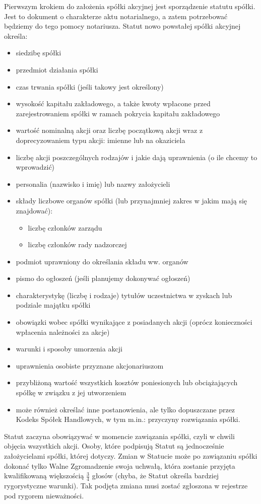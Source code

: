 \documentclass[11pt]{article}
\begin{document}
	
Pierwszym krokiem do założenia spółki akcyjnej jest sporządzenie statutu spółki.
	Jest to dokument o charakterze aktu notarialnego, a zatem potrzebować będziemy do tego pomocy notariusza. 
Statut nowo powstałej spółki akcyjnej określa:
\begin{itemize}
\item siedzibę spółki
\item przedmiot działania spółki
\item czas trwania spółki (jeśli takowy jest określony)
\item wysokość kapitału zakładowego, a także kwoty wpłacone przed zarejestrowaniem spółki w ramach pokrycia kapitału zakładowego
\item wartość nominalną akcji oraz liczbę początkową akcji wraz z doprecyzowaniem typu akcji: imienne lub na okaziciela
\item liczbę akcji poszczególnych rodzajów i jakie dają uprawnienia (o ile chcemy to wprowadzić)
\item personalia (nazwisko i imię) lub nazwy założycieli
\item składy liczbowe organów spółki (lub przynajmniej zakres w jakim mają się znajdować):
\begin{itemize}
\item liczbę członków zarządu
\item liczbę członków rady nadzorczej
\end{itemize}
\item podmiot uprawniony do określania składu ww. organów
\item pismo do ogłoszeń (jeśli planujemy dokonywać ogłoszeń)
\item charakterystykę (liczbę i rodzaje) tytułów uczestnictwa w zyskach lub podziale majątku spółki
\item obowiązki wobec spółki wynikające z posiadanych akcji (oprócz konieczności wpłacenia należności za akcje)
\item warunki  i sposoby umorzenia akcji
\item uprawnienia osobiste przyznane akcjonariuszom
\item przybliżoną wartość wszystkich kosztów poniesionych lub obciążających spółkę w związku z jej utworzeniem
\item może również określać inne postanowienia, ale tylko dopuszczane przez Kodeks Spółek Handlowych, w tym m.in.: przyczyny rozwiązania spółki.
\end{itemize}


Statut zaczyna obowiązywać w momencie zawiązania spółki, czyli w chwili objęcia wszystkich akcji.
Osoby, które podpisują Statut są jednocześnie założycielami spółki, której dotyczy.
Zmian w Statucie może po zawiązaniu spółki dokonać tylko Walne Zgromadzenie swoja uchwałą, która zostanie przyjęta kwalifikowaną większością $\frac{3}{4}$ głosów (chyba, że Statut określa bardziej rygorystyczne warunki). Tak podjęta zmiana musi zostać zgłoszona w rejestrze pod rygorem nieważności.
\end{document}
